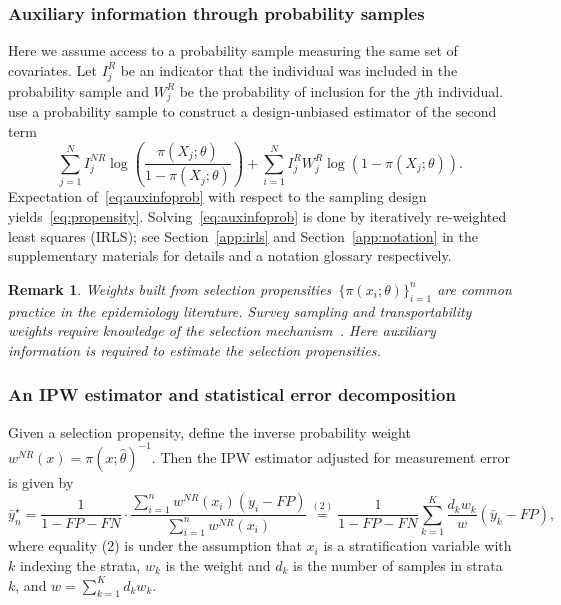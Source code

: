 \documentclass[11pt]{amsart}
\numberwithin{equation}{section}
\theoremstyle{plain}
\newtheorem{remark}{Remark}
\begin{document}
 \subsubsection{Auxiliary information through probability samples}
 \label{subsec:auxprob}

 Here we assume access to a probability sample measuring the same set of covariates.  Let $I_j^{R}$ be an indicator that the individual was included in the probability sample and $W_j^R$ be the probability of inclusion for the $j$th individual. \cite{Chen2019} use a probability sample to construct a design-unbiased estimator of the second term
 \begin{equation}
 \label{eq:auxinfoprob}
 \sum_{j=1}^N I_j^{NR} \log \left( \frac{\pi (X_j; \theta)}{1-\pi(X_j; \theta)} \right)  + \sum_{i=1}^N I_j^R W_j^R \log ( 1 - \pi (X_j; \theta)).
 \end{equation}
 Expectation of~\ref{eq:auxinfoprob} with respect to the sampling design yields~\eqref{eq:propensity}. Solving~\eqref{eq:auxinfoprob} is done by iteratively re-weighted least squares (IRLS); see Section~\ref{app:irls} and Section~\ref{app:notation} in the supplementary materials for details and a notation glossary respectively.
 \vspace{-0.5cm}
 \begin{remark}
 Weights built from selection propensities~$\{\pi(x_i; \theta)\}_{i=1}^n$ are common practice in the epidemiology literature.  Survey sampling and transportability weights require knowledge of the selection mechanism~\citep{10.1093/aje/kwx164,ColeStuart2010}.  Here auxiliary information is required to estimate the selection propensities.
 \end{remark}
 \vspace{-0.5cm}

 \subsubsection{An IPW estimator and statistical error decomposition}
 \label{section:IPWerrordecomp}

 Given a selection propensity, define the inverse probability weight~$w^{NR}(x) = \pi (x; \hat \theta)^{-1}$. Then the IPW estimator adjusted for measurement error is given by
 \begin{equation}
 \label{eq:ipwest}
 \bar y_n^\star
 = \frac{1}{1-FP-FN} \cdot \frac{\sum_{i=1}^n w^{NR} (x_i) (y_i - FP)}{\sum_{i=1}^n w^{NR} (x_i)}
 \stackrel{(2)}{=} \frac{1}{1-FP-FN} \sum_{k=1}^K \frac{d_k w_k}{w} (\bar y_k - FP),
 \end{equation}
 where equality (2) is under the assumption that $x_i$ is a stratification variable with $k$ indexing the strata, $w_k$ is the weight and $d_k$ is the number of samples in strata $k$, and $w = \sum_{k=1}^K d_k w_k$.
\end{document}
